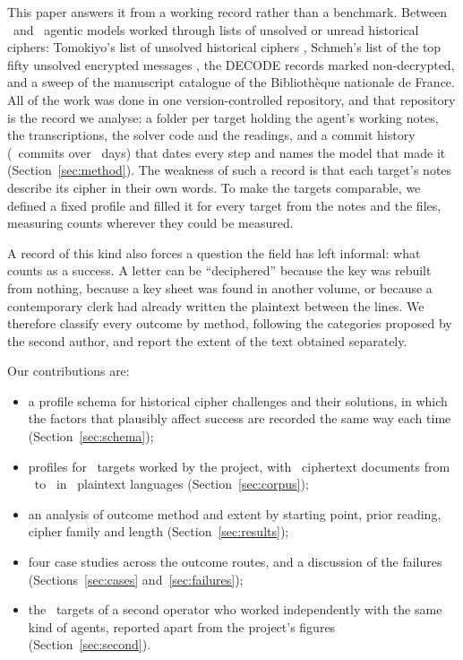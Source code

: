 \documentclass[11pt]{article}
\begin{document}
This paper answers it from a working record rather than a benchmark. Between \DateFirst\ and \DateLast\ agentic models worked through lists of unsolved or unread historical ciphers: Tomokiyo's list of unsolved historical ciphers \cite{Tomokiyo:unsolved}, Schmeh's list of the top fifty unsolved encrypted messages \cite{Schmeh:top50}, the DECODE records marked non-decrypted, and a sweep of the manuscript catalogue of the Biblioth\`eque nationale de France. All of the work was done in one version-controlled repository, and that repository is the record we analyse: a folder per target holding the agent's working notes, the transcriptions, the solver code and the readings, and a commit history (\Ncommits\ commits over \Ndays\ days) that dates every step and names the model that made it (Section~\ref{sec:method}). The weakness of such a record is that each target's notes describe its cipher in their own words. To make the targets comparable, we defined a fixed profile and filled it for every target from the notes and the files, measuring counts wherever they could be measured.

A record of this kind also forces a question the field has left informal: what counts as a success. A letter can be ``deciphered'' because the key was rebuilt from nothing, because a key sheet was found in another volume, or because a contemporary clerk had already written the plaintext between the lines. We therefore classify every outcome by method, following the categories proposed by the second author, and report the extent of the text obtained separately.

Our contributions are:
\begin{itemize}
\item a profile schema for historical cipher challenges and their solutions, in which the factors that plausibly affect success are recorded the same way each time (Section~\ref{sec:schema});
\item profiles for \Ntargets\ targets worked by the project, with \Ndocs\ ciphertext documents from \YearMin\ to \YearMax\ in \Nlanguages\ plaintext languages (Section~\ref{sec:corpus});
\item an analysis of outcome method and extent by starting point, prior reading, cipher family and length (Section~\ref{sec:results});
\item four case studies across the outcome routes, and a discussion of the failures (Sections~\ref{sec:cases} and~\ref{sec:failures});
\item the \NB\ targets of a second operator who worked independently with the same kind of agents, reported apart from the project's figures (Section~\ref{sec:second}).
\end{itemize}
\end{document}
